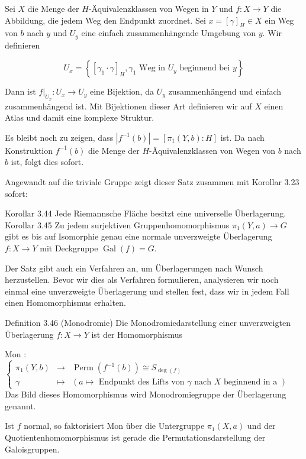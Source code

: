\documentclass[10pt, letterpaper]{article}
\begin{document}
Sei $X$ die Menge der $H$-Äquivalenzklassen von Wegen in $Y$ und $f: X \rightarrow Y$ die Abbildung, die jedem Weg den Endpunkt zuordnet. Sei $x=[\gamma]_{H} \in X$ ein Weg von $b$ nach $y$ und $U_{y}$ eine einfach zusammenhängende Umgebung von $y$. Wir definieren

$$
U_{x}=\left\{\left[\gamma_{1} \cdot \gamma\right]_{H}, \gamma_{1} \text { Weg in } U_{y} \text { beginnend bei } y\right\}
$$

Dann ist $\left.f\right|_{U_{x}}: U_{x} \rightarrow U_{y}$ eine Bijektion, da $U_{y}$ zusammenhängend und einfach zusammenhängend ist. Mit Bijektionen dieser Art definieren wir auf $X$ einen Atlas und damit eine komplexe Struktur.

Es bleibt noch zu zeigen, dass $\left|f^{-1}(b)\right|=\left[\pi_{1}(Y, b): H\right]$ ist. Da nach Konstruktion $f^{-1}(b)$ die Menge der $H$-Äquivalenzklassen von Wegen von $b$ nach $b$ ist, folgt dies sofort.

Angewandt auf die triviale Gruppe zeigt dieser Satz zusammen mit Korollar 3.23 sofort:

Korollar 3.44 Jede Riemannsche Fläche besitzt eine universelle Überlagerung.\\
Korollar 3.45 Zu jedem surjektiven Gruppenhomomorphismus $\pi_{1}(Y, a) \rightarrow G$ gibt es bis auf Isomorphie genau eine normale unverzweigte Überlagerung $f: X \rightarrow Y$ mit Deckgruppe $\operatorname{Gal}(f)=G$.

Der Satz gibt auch ein Verfahren an, um Überlagerungen nach Wunsch herzustellen. Bevor wir dies als Verfahren formulieren, analysieren wir noch einmal eine unverzweigte Überlagerung und stellen fest, dass wir in jedem Fall einen Homomorphismus erhalten.

Definition 3.46 (Monodromie) Die Monodromiedarstellung einer unverzweigten Überlagerung $f: X \rightarrow Y$ ist der Homomorphismus

Mon : $\left\{\begin{array}{cll}\pi_{1}(Y, b) & \longrightarrow & \operatorname{Perm}\left(f^{-1}(b)\right) \cong S_{\operatorname{deg}(f)} \\ \gamma & \longmapsto & (a \mapsto \text { Endpunkt des Lifts von } \gamma \text { nach } X \text { beginnend in a })\end{array}\right.$\\
Das Bild dieses Homomorphismus wird Monodromiegruppe der Überlagerung genannt.

Ist $f$ normal, so faktorisiert Mon über die Untergruppe $\pi_{1}(X, a)$ und der Quotientenhomomorphismus ist gerade die Permutationsdarstellung der Galoisgruppen.
\end{document}
